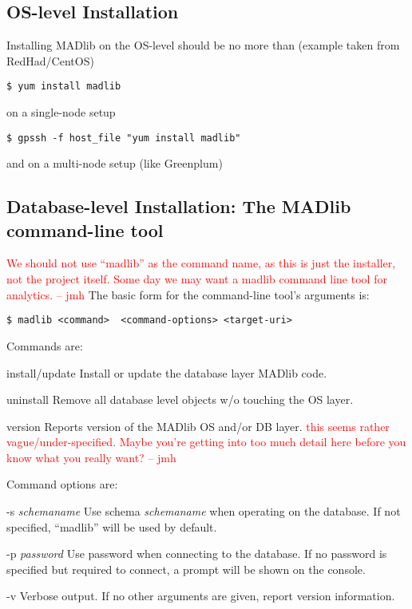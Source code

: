 \documentclass[11pt]{article}
\newcommand{\jmh}[1]{{\textcolor{red}{#1 -- jmh}}}
\begin{document}
{\subsection{OS-level Installation}

	Installing MADlib on the OS-level should be no more than (example taken from RedHad/CentOS)
	\begin{lstlisting}
$ yum install madlib
	\end{lstlisting}
	on a single-node setup
	\begin{lstlisting}
$ gpssh -f host_file "yum install madlib"
	\end{lstlisting}
	and on a multi-node setup (like Greenplum)

\subsection{Database-level Installation: The MADlib command-line tool}

\jmh{We should not use  ``madlib'' as the command name, as this is just the installer, not the project itself.  Some day we may want a madlib command line tool for analytics.}
	The basic form for the command-line tool's arguments is:

	\begin{lstlisting}
$ madlib <command>  <command-options> <target-uri>
	\end{lstlisting}

\begin{description}
	\item Commands are:
	\begin{ttdescription}
		\item[install/update] Install or update the database layer MADlib code.
		\item[uninstall] Remove all database level objects w/o touching the OS layer.
		\item[version] Reports version of the MADlib OS and/or DB layer. \jmh{this seems rather vague/under-specified.  Maybe you're getting into too much detail here before you know what you really want?}
	\end{ttdescription}

	\item Command options are:
	\begin{ttdescription}
		\item[-s \textit{schemaname}] Use schema \textit{schemaname} when operating on the database. If not specified, ``madlib'' will be used by default. 
		\item[-p \textit{password}] Use password  when connecting to the database. If no password is specified but required to connect, a prompt will be shown on the console.
		\item[-v] Verbose output. If no other arguments are given, report version information.
	\end{ttdescription}


\end{description}}
\end{document}
